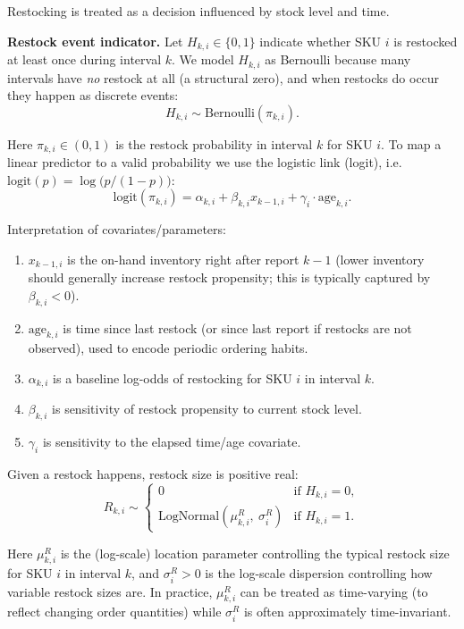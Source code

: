 \documentclass[11pt]{article}
\begin{document}
Restocking is treated as a decision influenced by stock level and time.

\textbf{Restock event indicator.} Let $H_{k,i}\in\{0,1\}$ indicate whether SKU $i$ is restocked at least once during interval $k$.
We model $H_{k,i}$ as Bernoulli because many intervals have \emph{no} restock at all (a structural zero), and when restocks do occur they happen as discrete events:
\[
  H_{k,i} \sim \text{Bernoulli}(\pi_{k,i}).
\]

Here $\pi_{k,i}\in(0,1)$ is the restock probability in interval $k$ for SKU $i$.
To map a linear predictor to a valid probability we use the logistic link (logit), i.e.
$\text{logit}(p)=\log\!\bigl(p/(1-p)\bigr)$:
\[
  \text{logit}(\pi_{k,i}) = \alpha_{k,i} + \beta_{k,i} x_{k-1,i} + \gamma_i \cdot \text{age}_{k,i}.
\]

Interpretation of covariates/parameters:
\begin{enumerate}
  \item $x_{k-1,i}$ is the on-hand inventory right after report $k-1$ (lower inventory should generally increase restock propensity; this is typically captured by $\beta_{k,i}<0$).
  \item $\text{age}_{k,i}$ is time since last restock (or since last report if restocks are not observed), used to encode periodic ordering habits.
  \item $\alpha_{k,i}$ is a baseline log-odds of restocking for SKU $i$ in interval $k$.
  \item $\beta_{k,i}$ is sensitivity of restock propensity to current stock level.
  \item $\gamma_i$ is sensitivity to the elapsed time/age covariate.
\end{enumerate}

Given a restock happens, restock size is positive real:
\[
  R_{k,i} \sim
  \begin{cases}
    0 & \text{if } H_{k,i} = 0,\\
    \text{LogNormal}(\mu^{R}_{k,i},\ \sigma^{R}_i) & \text{if } H_{k,i} = 1.
  \end{cases}
\]

Here $\mu^{R}_{k,i}$ is the (log-scale) location parameter controlling the typical restock size for SKU $i$ in interval $k$, and $\sigma^{R}_i>0$ is the log-scale dispersion controlling how variable restock sizes are.
In practice, $\mu^{R}_{k,i}$ can be treated as time-varying (to reflect changing order quantities) while $\sigma^{R}_i$ is often approximately time-invariant.
\end{document}
